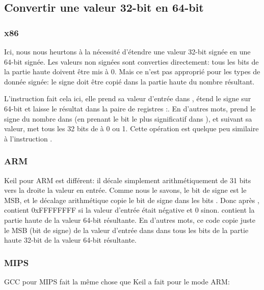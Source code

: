 ﻿\subsection{Convertir une valeur 32-bit en 64-bit}
\label{subsec:sign_extending_32_to_64}



\subsubsection{x86}



Ici, nous nous heurtons à la nécessité d'étendre une valeur 32-bit signée en une
64-bit signée.
Les valeurs non signées sont converties directement: tous les bits de la partie haute
doivent être mis à 0.
Mais ce n'est pas approprié pour les types de donnée signée: le signe doit être copié
dans la partie haute du nombre résultant.

L'instruction  fait cela ici, elle prend sa valeur d'entrée dans \EAX{},
étend le signe sur 64-bit et laisse le résultat dans la paire de registres \EDX{}:\EAX{}.
En d'autres mots,  prend le signe du nombre dans \EAX{} (en prenant le bit
le plus significatif dans \EAX{}), et suivant sa valeur, met tous les 32 bits de
\EDX{} à 0 ou 1.
Cette opération est quelque peu similaire à l'instruction \MOVSX{}.

\subsubsection{ARM}



Keil pour ARM est différent: il décale simplement arithmétiquement de 31 bits vers
la droite la valeur en entrée.
Comme nous le savons, le bit de signe est le \ac{MSB}, et le décalage arithmétique
copie le bit de signe dans les bits .
Donc après ,  contient 0xFFFFFFFF si la valeur d'entrée
était négative et 0 sinon.
 contient la partie haute de la valeur 64-bit résultante.
En d'autres mots, ce code copie juste le \ac{MSB} (bit de signe) de la valeur d'entrée
dans  dans tous les bits de la partie haute 32-bit de la valeur 64-bit résultante.

\subsubsection{MIPS}

GCC pour MIPS fait la même chose que Keil a fait pour le mode ARM:



